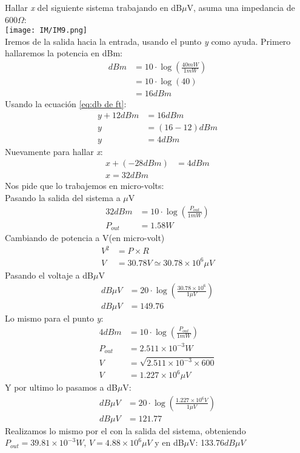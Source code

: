 \documentclass[
	12pt, %
	fleqn, %
	a4paper, %
	oneside, %
]{LegrandOrangeBook}
\begin{document}
\begin{example}
Hallar \textit{x} del siguiente sistema trabajando en dB$\mu$V, asuma una impedancia de 600$\Omega$:\\
\texttt{[image: IM/IM9.png]}\\
Iremos de la salida hacia la entrada, usando el punto \textit{y} como ayuda. Primero hallaremos la potencia en dBm:
\begin{align*}
dBm&=10\cdot\log\left(\frac{40mW}{1mW}\right)\\
&=10\cdot\log\left(40\right)\\
&=16dBm
\end{align*}
Usando la ecuación \ref{eq:db de ft}:
\begin{align*}
y+12dBm&=16dBm\\
y&=(16-12)dBm\\
y&=4dBm
\end{align*}
Nuevamente para hallar \textit{x}:
\begin{align*}
x+(-28dBm)&=4dBm\\
x=32dBm
\end{align*}
Nos pide que lo trabajemos en micro-volts:\\
Pasando la salida del sistema a $\mu$V
\begin{align*}
32dBm&=10\cdot\log\left(\frac{P_{out}}{1mW}\right)\\
P_{out}&=1.58W
\end{align*}
Cambiando de potencia a V(en micro-volt)
\begin{align*}
V^2&=P\times R\\
V&=30.78V\simeq 30.78\times 10^6\mu V	
\end{align*}
Pasando el voltaje a dB$\mu$V
\begin{align*}
dB\mu V&=20\cdot\log\left(\frac{30.78\times 10^6}{1\mu V}\right)\\
dB\mu V&=149.76
\end{align*}
Lo mismo para el punto \textit{y}:
\begin{align*}
4dBm&=10\cdot\log\left(\frac{P_{out}}{1mW}\right)\\
P_{out}&=2.511\times 10^{-3}W\\
V&=\sqrt{2.511\times 10^{-3}\times 600}\\
V&=1.227\times 10^6\mu V
\end{align*}
Y por ultimo lo pasamos a dB$\mu$V:
\begin{align*}
dB\mu V&=20\cdot\log\left(\frac{1.227\times 10^6V}{1\mu V}\right)\\
dB\mu V&=121.77
\end{align*}
Realizamos lo mismo por el con la salida del sistema, obteniendo $P_{out}=39.81\times 10^{-3}W$, $V=4.88\times 10^6\mu V$ y en dB$\mu$V: 133.76$dB\mu V$
\end{example}
\end{document}
